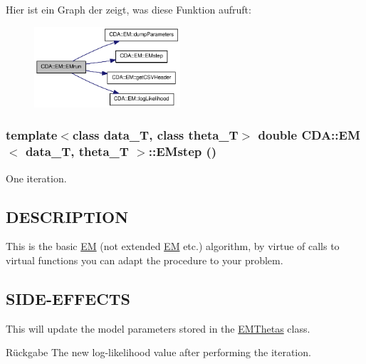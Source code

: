Hier ist ein Graph der zeigt, was diese Funktion aufruft:\nopagebreak
\begin{figure}[H]
\begin{center}
\leavevmode
\includegraphics[width=154pt]{classCDA_1_1EM_a1c8fa9008da1f168f211f48c578dce5f_cgraph}
\end{center}
\end{figure}


\hypertarget{classCDA_1_1EM_a33684f64b72aff4c65150e12ea23e6aa}{
\subsubsection[{EMstep}]{\setlength{\rightskip}{0pt plus 5cm}template$<$class data\_\-T, class theta\_\-T$>$ double {\bf CDA::EM}$<$ data\_\-T, theta\_\-T $>$::EMstep ()}}
\label{classCDA_1_1EM_a33684f64b72aff4c65150e12ea23e6aa}


One iteration. 

\hypertarget{ProbabilisticClustering_8h_09_09_DESCRIPTION}{}\subsection{DESCRIPTION}\label{ProbabilisticClustering_8h_09_09_DESCRIPTION}
This is the basic \hyperlink{classCDA_1_1EM}{EM} (not extended \hyperlink{classCDA_1_1EM}{EM} etc.) algorithm, by virtue of calls to virtual functions you can adapt the procedure to your problem.\hypertarget{classCDA_1_1EM_SIDE-EFFECTS}{}\subsection{SIDE-\/EFFECTS}\label{classCDA_1_1EM_SIDE-EFFECTS}
This will update the model parameters stored in the \hyperlink{classCDA_1_1EMThetas}{EMThetas} class.

\begin{DoxyReturn}{Rückgabe}
The new log-\/likelihood value after performing the iteration. 
\end{DoxyReturn}



